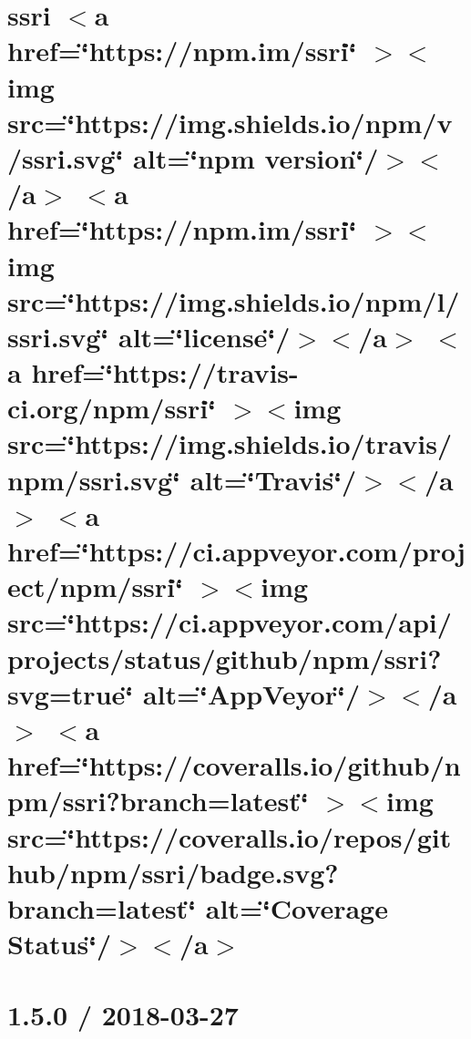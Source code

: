 \documentclass[twoside]{book}
\newcommand{\+}{\discretionary{\mbox{\scriptsize$\hookleftarrow$}}{}{}}
\begin{document}
\chapter{ssri \texorpdfstring{$<$}{<}a href=\char`\"{}https\+://npm.\+im/ssri\char`\"{} \texorpdfstring{$>$}{>}\texorpdfstring{$<$}{<}img src=\char`\"{}https\+://img.\+shields.\+io/npm/v/ssri.\+svg\char`\"{} alt=\char`\"{}npm version\char`\"{}/\texorpdfstring{$>$}{>}\texorpdfstring{$<$}{<}/a\texorpdfstring{$>$}{>} \texorpdfstring{$<$}{<}a href=\char`\"{}https\+://npm.\+im/ssri\char`\"{} \texorpdfstring{$>$}{>}\texorpdfstring{$<$}{<}img src=\char`\"{}https\+://img.\+shields.\+io/npm/l/ssri.\+svg\char`\"{} alt=\char`\"{}license\char`\"{}/\texorpdfstring{$>$}{>}\texorpdfstring{$<$}{<}/a\texorpdfstring{$>$}{>} \texorpdfstring{$<$}{<}a href=\char`\"{}https\+://travis-\/ci.\+org/npm/ssri\char`\"{} \texorpdfstring{$>$}{>}\texorpdfstring{$<$}{<}img src=\char`\"{}https\+://img.\+shields.\+io/travis/npm/ssri.\+svg\char`\"{} alt=\char`\"{}\+Travis\char`\"{}/\texorpdfstring{$>$}{>}\texorpdfstring{$<$}{<}/a\texorpdfstring{$>$}{>} \texorpdfstring{$<$}{<}a href=\char`\"{}https\+://ci.\+appveyor.\+com/project/npm/ssri\char`\"{} \texorpdfstring{$>$}{>}\texorpdfstring{$<$}{<}img src=\char`\"{}https\+://ci.\+appveyor.\+com/api/projects/status/github/npm/ssri?svg=true\char`\"{} alt=\char`\"{}\+App\+Veyor\char`\"{}/\texorpdfstring{$>$}{>}\texorpdfstring{$<$}{<}/a\texorpdfstring{$>$}{>} \texorpdfstring{$<$}{<}a href=\char`\"{}https\+://coveralls.\+io/github/npm/ssri?branch=latest\char`\"{} \texorpdfstring{$>$}{>}\texorpdfstring{$<$}{<}img src=\char`\"{}https\+://coveralls.\+io/repos/github/npm/ssri/badge.\+svg?branch=latest\char`\"{} alt=\char`\"{}\+Coverage Status\char`\"{}/\texorpdfstring{$>$}{>}\texorpdfstring{$<$}{<}/a\texorpdfstring{$>$}{>}}
\label{md__c___users_vaishnavi_jadhav__desktop__developer_code_mean_stack_example_client_node_modules_ssri__r_e_a_d_m_e}

\chapter{1.5.0 / 2018-\/03-\/27}
\label{md__c___users_vaishnavi_jadhav__desktop__developer_code_mean_stack_example_client_node_modules_statuses__h_i_s_t_o_r_y}

\end{document}

